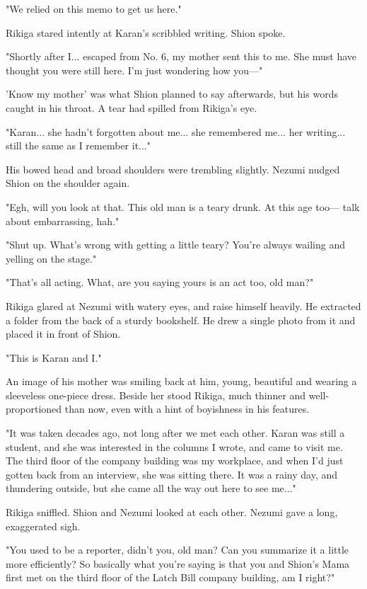 "We relied on this memo to get us here."

Rikiga stared intently at Karan's scribbled writing. Shion spoke.

"Shortly after I... escaped from No. 6, my mother sent this to me. She
must have thought you were still here. I'm just wondering how you---"

'Know my mother' was what Shion planned to say afterwards, but his words
caught in his throat. A tear had spilled from Rikiga's eye.

"Karan... she hadn't forgotten about me... she remembered me... her
writing... still the same as I remember it..."

His bowed head and broad shoulders were trembling slightly. Nezumi
nudged Shion on the shoulder again.

"Egh, will you look at that. This old man is a teary drunk. At this age
too--- talk about embarrassing, hah."

"Shut up. What's wrong with getting a little teary? You're always
wailing and yelling on the stage."

"That's all acting. What, are you saying yours is an act too, old man?"

Rikiga glared at Nezumi with watery eyes, and raise himself heavily. He
extracted a folder from the back of a sturdy bookshelf. He drew a single
photo from it and placed it in front of Shion.

"This is Karan and I."

An image of his mother was smiling back at him, young, beautiful and
wearing a sleeveless one-piece dress. Beside her stood Rikiga, much
thinner and well-proportioned than now, even with a hint of boyishness
in his features.

"It was taken decades ago, not long after we met each other. Karan was
still a student, and she was interested in the columns I wrote, and came
to visit me. The third floor of the company building was my workplace,
and when I'd just gotten back from an interview, she was sitting there.
It was a rainy day, and thundering outside, but she came all the way out
here to see me..."

Rikiga sniffled. Shion and Nezumi looked at each other. Nezumi gave a
long, exaggerated sigh.

"You used to be a reporter, didn't you, old man? Can you summarize it a
little more efficiently? So basically what you're saying is that you and
Shion's Mama first met on the third floor of the Latch Bill company
building, am I right?"

